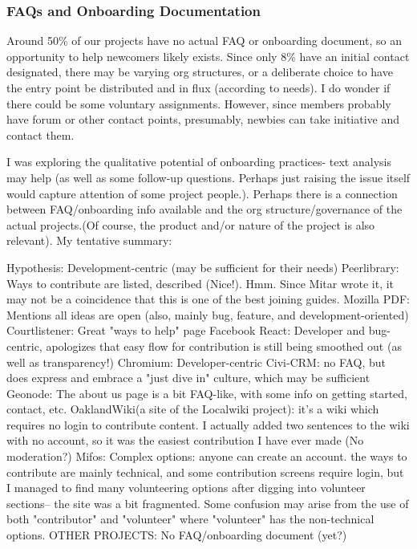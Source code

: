 \subsubsection{FAQs and Onboarding Documentation}

Around 50\% of our projects have no actual FAQ or onboarding document, so an opportunity to help newcomers likely exists. Since only 8\% have an initial contact designated, there may be varying org structures, or a deliberate choice to have the entry point be distributed and in flux (according to needs). I do wonder if there could be some voluntary assignments. However, since members probably have forum or other contact points, presumably, newbies can take initiative and contact them.

I was exploring the qualitative potential of onboarding practices- text analysis may help (as well as some follow-up questions. Perhaps just raising the issue itself would capture attention of some project people.). Perhaps there is a connection between FAQ/onboarding info available and the org structure/governance of the actual projects.(Of course, the product and/or nature of the project is also relevant). My tentative summary:

Hypothesis: Development-centric (may be sufficient for their needs)
Peerlibrary: Ways to contribute are listed, described (Nice!). Hmm. Since Mitar wrote it, it may not be a coincidence that this is one of the best joining guides.
Mozilla PDF: Mentions all ideas are open (also, mainly bug, feature, and development-oriented)
Courtlistener: Great "ways to help" page
Facebook React: Developer and bug-centric, apologizes that easy flow for contribution is still being smoothed out (as well as transparency!)
Chromium: Developer-centric
Civi-CRM: no FAQ, but does express and embrace a  "just dive in" culture, which may be sufficient
Geonode: The about us page is a bit FAQ-like, with some info on getting started, contact, etc.
OaklandWiki(a site of the Localwiki project): it's a wiki which requires no login to contribute content. I actually added two sentences to the wiki with no account, so it was the easiest contribution I have ever made (No moderation?)
Mifos: Complex options: anyone can create an account. the ways to contribute are mainly technical, and some contribution screens require login, but I managed to find many volunteering options after digging into volunteer sections-- the site was a bit fragmented. Some confusion may arise from the use of both "contributor" and "volunteer" where "volunteer" has the non-technical options.
OTHER PROJECTS: No FAQ/onboarding document (yet?)




